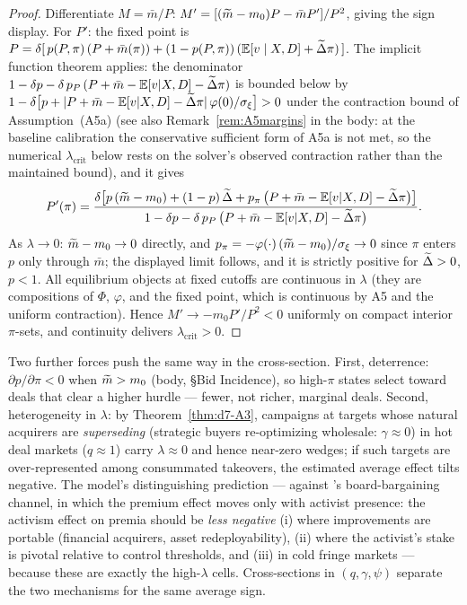 \begin{proof}
Differentiate $M=\bar m/P$: $M'=[(\widetilde{m}-m_{0})P-\bar m P']/P^{2}$, giving the sign display. For $P'$: the fixed point is $P=\delta[\,p(P,\pi)\,(P+\bar m(\pi))+(1-p(P,\pi))\,(\mathbb{E}[v\mid X,D]+\widetilde{\Delta}\pi)\,]$. The implicit function theorem applies: the denominator $1-\delta p-\delta\,p_{P}\,(P+\bar m-\mathbb{E}[v|X,D]-\widetilde{\Delta}\pi)$ is bounded below by $1-\delta\bigl[p+|P+\bar m-\mathbb{E}[v|X,D]-\widetilde{\Delta}\pi|\,\varphi(0)/\sigma_{\xi}\bigr]>0$ under the contraction bound of Assumption~\textup{(A5a)} (see also Remark~\ref{rem:A5margins} in the body: at the baseline calibration the conservative sufficient form of A5a is not met, so the numerical $\lambda_{\mathrm{crit}}$ below rests on the solver's observed contraction rather than the maintained bound), and it gives
\[
P'(\pi)=\frac{\delta\bigl[p\,(\widetilde{m}-m_{0})+(1-p)\,\widetilde{\Delta}+p_{\pi}\,\bigl(P+\bar m-\mathbb{E}[v|X,D]-\widetilde{\Delta}\pi\bigr)\bigr]}{1-\delta p-\delta\,p_{P}\,\bigl(P+\bar m-\mathbb{E}[v|X,D]-\widetilde{\Delta}\pi\bigr)} .
\]
As $\lambda\to0$: $\widetilde{m}-m_{0}\to0$ directly, and $p_{\pi}=-\varphi(\cdot)\,(\widetilde{m}-m_{0})/\sigma_{\xi}\to0$ since $\pi$ enters $p$ only through $\bar m$; the displayed limit follows, and it is strictly positive for $\widetilde{\Delta}>0$, $p<1$. All equilibrium objects at fixed cutoffs are continuous in $\lambda$ (they are compositions of $\Phi$, $\varphi$, and the fixed point, which is continuous by A5 and the uniform contraction). Hence $M'\to-m_{0}P'/P^{2}<0$ uniformly on compact interior $\pi$-sets, and continuity delivers $\lambda_{\mathrm{crit}}>0$.
\end{proof}

\begin{remark}
\label{rem:d7-afs-comp}
Two further forces push the same way in the cross-section. First, deterrence: $\partial p/\partial\pi<0$ when $\widetilde{m}>m_{0}$ (body, \S Bid Incidence), so high-$\pi$ states select toward deals that clear a higher hurdle --- fewer, not richer, marginal deals. Second, heterogeneity in $\lambda$: by Theorem~\ref{thm:d7-A3}, campaigns at targets whose natural acquirers are \emph{superseding} (strategic buyers re-optimizing wholesale: $\gamma\approx0$) in hot deal markets ($q\approx1$) carry $\lambda\approx0$ and hence near-zero wedges; if such targets are over-represented among consummated takeovers, the estimated average effect tilts negative. The model's distinguishing prediction --- against \citet{CelentanoLevine2025}'s board-bargaining channel, in which the premium effect moves only with activist presence: the activism effect on premia should be \emph{less negative} (i) where improvements are portable (financial acquirers, asset redeployability), (ii) where the activist's stake is pivotal relative to control thresholds, and (iii) in cold fringe markets --- because these are exactly the high-$\lambda$ cells. Cross-sections in $(q,\gamma,\psi)$ separate the two mechanisms for the same average sign.
\end{remark}

